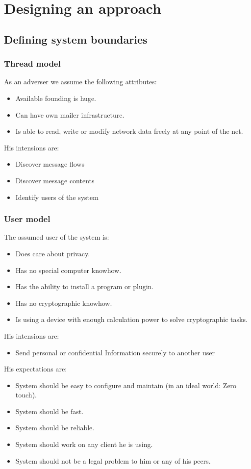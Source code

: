 \chapter{Designing an approach}
\section{Defining system boundaries}
\subsection{Thread model}
As an adverser we assume the following attributes:
\begin{itemize}
\item Available founding is huge.
\item Can have own mailer infrastructure.
\item Is able to read, write or modify network data freely at any point of the net.
\end{itemize}
His intensions are:
\begin{itemize}
\item Discover message flows
\item Discover message contents
\item Identify users of the system
\end{itemize}

\subsection{User model}
The assumed user of the system is:
\begin{itemize}
\item Does care about privacy.
\item Has no special computer knowhow.
\item Has the ability to install a program or plugin.
\item Has no cryptographic knowhow.
\item Is using a device with enough calculation power to solve cryptographic tasks.
\end{itemize}
His intensions are:
\begin{itemize}
\item Send personal or confidential Information securely to another user
\end{itemize}
His expectations are:
\begin{itemize}
\item System should be easy to configure and maintain (in an ideal world: Zero touch). 
\item System should be fast.
\item System should be reliable.
\item System should work on any client he is using.
\item System should not be a legal problem to him or any of his peers.
\end{itemize}

